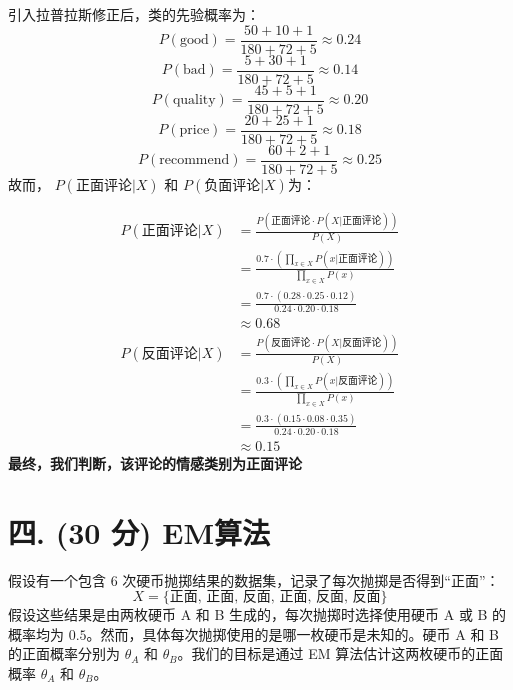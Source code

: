 \documentclass[8pt]{article}
\begin{document}
\begin{enumerate}
    引入拉普拉斯修正后，类的先验概率为：
    \[P(\text{good}) = \frac{50 + 10 + 1}{180 + 72 + 5}
    \approx 0.24
    \]
    \[P(\text{bad}) = \frac{5 + 30 + 1}{180 + 72 + 5}
    \approx 0.14
    \]
    \[P(\text{quality}) = \frac{45 + 5 + 1}{180 + 72 + 5}
    \approx 0.20
    \]
    \[P(\text{price}) = \frac{20 + 25 + 1}{180 + 72 + 5}
    \approx 0.18
    \]
    \[P(\text{recommend}) = \frac{60 + 2 + 1}{180 + 72 + 5}
    \approx 0.25
    \]
故而， \( P(\text{正面评论} | X) \) 和 \( P(\text{负面评论} | X)\)为：

    \begin{align*}
    P(\text{正面评论} | X) 
    & = \frac{P(\text{正面评论} \cdot P(X | \text{正面评论}))}{P(X)} 
    \\
    & = \frac
        {
            0.7 \cdot (\prod_{x\in{X}}{P(x|\text{正面评论})})
        }
        {
            \prod_{x\in{X}}{P(x)}
        }
    \\ 
    & = \frac
        {
            0.7 \cdot (0.28 \cdot 0.25 \cdot 0.12)
        }
        {
            0.24 \cdot 0.20 \cdot 0.18
        }
    \\
    & \approx 0.68
    \end{align*}
    \begin{align*}
    P(\text{反面评论} | X) 
    & = \frac{P(\text{反面评论} \cdot P(X | \text{反面评论}))}{P(X)} 
    \\
    & = \frac
        {
            0.3 \cdot (\prod_{x\in{X}}{P(x|\text{反面评论})})
        }
        {
            \prod_{x\in{X}}{P(x)}
        }
    \\ 
    & = \frac
        {
            0.3 \cdot (0.15 \cdot 0.08 \cdot 0.35)
        }
        {
            0.24 \cdot 0.20 \cdot 0.18
        }
    \\
    & \approx 0.15
    \end{align*}
{\color{blue}\textbf{最终，我们判断，该评论的情感类别为正面评论}}
\end{enumerate}


\vspace{3em}

\section*{四. (30 分) EM算法}
假设有一个包含 6 次硬币抛掷结果的数据集，记录了每次抛掷是否得到“正面”：
\[
X = \{\text{正面, 正面, 反面, 正面, 反面, 反面}\}
\]
假设这些结果是由两枚硬币 A 和 B 生成的，每次抛掷时选择使用硬币 A 或 B 的概率均为 \(0.5\)。然而，具体每次抛掷使用的是哪一枚硬币是未知的。硬币 A 和 B 的正面概率分别为 \( \theta_A \) 和 \( \theta_B \)。我们的目标是通过 EM 算法估计这两枚硬币的正面概率 \( \theta_A \) 和 \( \theta_B \)。
\end{document}
